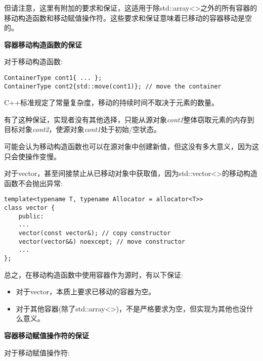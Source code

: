 但请注意，这里有附加的要求和保证，这适用于除std::array<>之外的所有容器的移动构造函数和移动赋值操作符。这些要求和保证意味着已移动的容器移动是空的。\par

\hspace*{\fill} \par %
\textbf{容器移动构造函数的保证}

对于移动构造函数:\par

\begin{lstlisting}[caption={}]
ContainerType cont1{ ... };
ContainerType cont2{std::move(cont1)}; // move the container
\end{lstlisting}

C++标准规定了常量复杂度，移动的持续时间不取决于元素的数量。\par

有了这种保证，实现者没有其他选择，只能从源对象\textit{cont1}整体窃取元素的内存到目标对象\textit{cont2}，使源对象\textit{cont1}处于初始/空状态。\par

可能会认为移动构造函数也可以在源对象中创建新值，但这没有多大意义，因为这只会使操作变慢。\par

对于vector，甚至间接禁止从已移动对象中获取值，因为std::vector<>的移动构造函数不会抛出异常:\par

\begin{lstlisting}[caption={}]
template<typename T, typename Allocator = allocator<T>>
class vector {
	public:
	...
	vector(const vector&); // copy constructor
	vector(vector&&) noexcept; // move constructor
	...
};
\end{lstlisting}

总之，在移动构造函数中使用容器作为源时，有以下保证:\par

\begin{itemize}
	\item 对于vector，本质上要求已移动的容器为空。
	\item 对于其他容器(除了std::array<>)，不是严格要求为空，但实现为其他也没什么意义。
\end{itemize}

\hspace*{\fill} \par %
\textbf{容器移动赋值操作符的保证}

对于移动赋值操作符:\par

